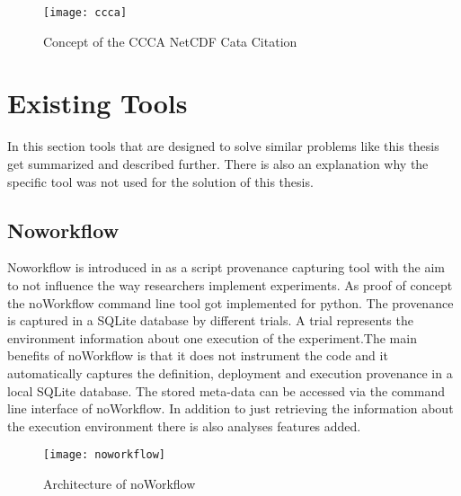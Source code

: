 \documentclass[draft,final]{vutinfth} %
\begin{document}
\begin{figure}[h]
	\centering
	\texttt{[image: ccca]}
	\caption{Concept of the CCCA NetCDF Cata Citation \cite{ccca}}
	\label{fig:ccca} %
\end{figure}


\section{Existing Tools}\label{Existing Tools}
In this section tools that are designed to solve similar problems like this thesis get summarized and described further. There is also an explanation why the specific tool was not used for the solution of this thesis. 

\subsection{Noworkflow}\label{Noworkflow}
Noworkflow is introduced in \cite{c9e0604becba42af96a9cb0a6f60018b} as a script provenance capturing tool with the aim to not influence the way researchers implement experiments. As proof of concept the noWorkflow command line tool got implemented for python. The provenance is captured in a SQLite database by different trials. A trial represents the environment information about one execution of the experiment.The main benefits of noWorkflow is that it does not instrument the code and it automatically captures the definition, deployment and execution provenance in a local SQLite database. The stored meta-data can be accessed via the command line interface of noWorkflow. In addition to just retrieving the information about the execution environment there is also analyses features added.\cite{c9e0604becba42af96a9cb0a6f60018b}

\begin{figure}[h]
	\centering
	\texttt{[image: noworkflow]}
	\caption{Architecture of noWorkflow \cite{c9e0604becba42af96a9cb0a6f60018b}}
	\label{fig:noworkflow} %
\end{figure}
\end{document}

